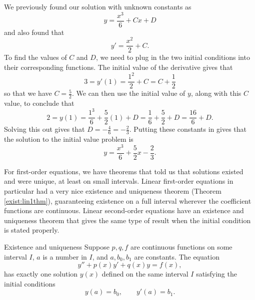 \documentclass{ximera}
\begin{document}
\begin{exampleSol}
    We previously found our solution with unknown constants as
    \begin{equation*}
        y = \frac{x^3}{6} + Cx + D
    \end{equation*}
    and also found that
    \begin{equation*}
        y' = \frac{x^2}{2} + C.
    \end{equation*}
    To find the values of $C$ and $D$, we need to plug in the two initial conditions into their corresponding functions. The initial value of the derivative gives that
    \begin{equation*}
        3 = y'(1) = \frac{1^2}{2} + C = C + \frac{1}{2}
    \end{equation*}
    so that we have $C = \frac{5}{2}$. We can then use the initial value of $y$, along with this $C$ value, to conclude that
    \begin{equation*}
        2 = y(1) = \frac{1^3}{6} + \frac{5}{2}(1) + D = \frac{1}{6} + \frac{5}{2} + D = \frac{16}{6} + D.
    \end{equation*}
    Solving this out gives that $D = -\frac{4}{6} = -\frac{2}{3}$. Putting these constants in gives that the solution to the initial value problem is
    \begin{equation*}
        y = \frac{x^3}{6} + \frac{5}{2}x - \frac{2}{3}.
    \end{equation*}
\end{exampleSol}

For first-order equations, we have theorems that told us that solutions existed and were unique, at least on small intervals. Linear first-order equations in particular had a very nice existence and uniqueness theorem (Theorem \ref{exist:lin1thm}), guaranteeing existence on a full interval wherever the coefficient functions are continuous. Linear second-order equations have an existence and uniqueness theorem that gives the same type of result when the initial condition is stated properly.

\begin{theorem}{Existence and uniqueness}
    Suppose $p, q, f$ are continuous functions on some interval $I$, $a$ is a number in $I$, and $a, b_0, b_1$ are constants. The equation
    \begin{equation*}
        y'' + p(x) y' + q(x) y = f(x) ,
    \end{equation*}
    has exactly one solution $y(x)$ defined on the same interval $I$ satisfying the initial conditions
    \begin{equation*}
        y(a) = b_0 , \qquad y'(a) = b_1 .
    \end{equation*}
\end{theorem}
\end{document}
